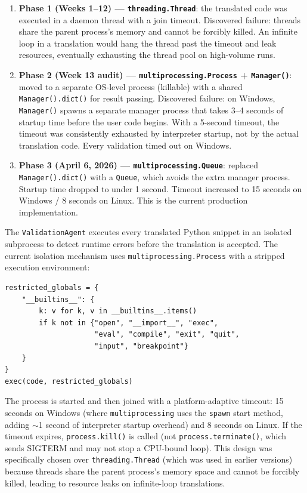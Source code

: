 \begin{enumerate}
  \item \textbf{Phase 1 (Weeks 1--12) --- \texttt{threading.Thread}}: the
    translated code was executed in a daemon thread with a join timeout.
    Discovered failure: threads share the parent process's memory and cannot
    be forcibly killed. An infinite loop in a translation would hang the thread
    past the timeout and leak resources, eventually exhausting the thread pool
    on high-volume runs.
  \item \textbf{Phase 2 (Week 13 audit) --- \texttt{multiprocessing.Process}
    + \texttt{Manager()}}:  moved to a separate OS-level process (killable)
    with a shared \texttt{Manager().dict()} for result passing. Discovered
    failure: on Windows, \texttt{Manager()} spawns a separate manager process
    that takes 3--4 seconds of startup time before the user code begins.
    With a 5-second timeout, the timeout was consistently exhausted by
    interpreter startup, not by the actual translation code. Every validation
    timed out on Windows.
  \item \textbf{Phase 3 (April 6, 2026) --- \texttt{multiprocessing.Queue}}:
    replaced \texttt{Manager().dict()} with a \texttt{Queue}, which avoids
    the extra manager process. Startup time dropped to under 1 second. Timeout
    increased to 15 seconds on Windows / 8 seconds on Linux. This is the
    current production implementation.
\end{enumerate}

The \texttt{ValidationAgent} executes every translated Python snippet in an
isolated subprocess to detect runtime errors before the translation is accepted.
The current isolation mechanism uses \texttt{multiprocessing.Process} with
a stripped execution environment:

\begin{verbatim}
restricted_globals = {
    "__builtins__": {
        k: v for k, v in __builtins__.items()
        if k not in {"open", "__import__", "exec",
                     "eval", "compile", "exit", "quit",
                     "input", "breakpoint"}
    }
}
exec(code, restricted_globals)
\end{verbatim}

The process is started and then joined with a platform-adaptive timeout:
15 seconds on Windows (where \texttt{multiprocessing} uses the \texttt{spawn}
start method, adding $\sim$1 second of interpreter startup overhead) and
8 seconds on Linux. If the timeout expires, \texttt{process.kill()} is called
(not \texttt{process.terminate()}, which sends SIGTERM and may not stop a
CPU-bound loop). This design was specifically chosen over
\texttt{threading.Thread} (which was used in earlier versions) because threads
share the parent process's memory space and cannot be forcibly killed, leading
to resource leaks on infinite-loop translations.

